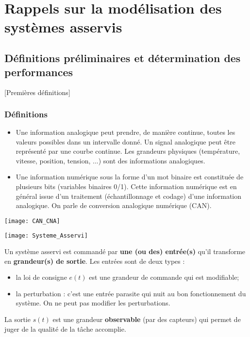 \setchapterpreamble[u]{\margintoc}

\chapter{Rappels sur la modélisation des systèmes asservis}
\section{Définitions préliminaires et détermination des performances}[Premières définitions]

\subsection{Définitions}


\begin{defi} 

\begin{itemize}%
\item Une information analogique peut prendre, de manière continue, toutes les valeurs
possibles dans un intervalle donné. Un signal analogique peut être représenté
par une courbe continue. Les grandeurs physiques (température, vitesse,
position, tension, ...) sont des informations analogiques.

\item Une information numérique sous la forme d'un mot binaire est constituée de
plusieurs bits (variables binaires 0/1). Cette information numérique est en
général issue d'un traitement (échantillonnage et codage) d'une information
analogique. On parle de conversion analogique numérique (CAN).
\end{itemize}
\end{defi}

\begin{center}
\texttt{[image: CAN\_CNA]}
\end{center}

\begin{marginfigure}[1cm]
\texttt{[image: Systeme\_Asservi]}
\end{marginfigure}


\begin{defi}

Un système asservi est commandé par \textbf{une (ou des) entrée(s)} qu'il
transforme en \textbf{grandeur(s) de sortie}.
Les entrées sont de deux types : 
\begin{itemize}
\item la loi de consigne $e(t)$ est une grandeur de commande qui est modifiable;
\item la perturbation : c'est une entrée parasite qui nuit au bon
fonctionnement du système. On ne peut pas modifier les perturbations.
\end{itemize}

La sortie $s(t)$ est une grandeur \textbf{observable} (par des capteurs) qui
permet de juger de la qualité de la tâche accomplie.
\end{defi} 



